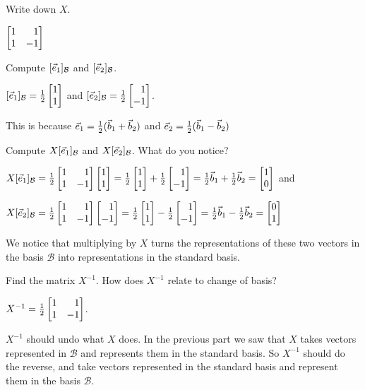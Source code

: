 	\begin{parts}
		\item Write down $X$.
			\begin{solution}[inline]
				$\mat{1&1\\1&-1}$
			\end{solution}
		\item Compute $[{\vec e_1}]_{\mathcal B}$ and $[{\vec e_2}]_{\mathcal B}$.
			\begin{solution}
				$[\xhat]_{\mathcal B}=\frac{1}{2}\mat{1\\1}$ and
				$[\yhat]_{\mathcal B}=\frac{1}{2}\mat{1\\-1}$.

				This is because ${\vec e_1}=\frac{1}{2}(\vec b_1+\vec b_2)$ and
				${\vec e_2}=\frac{1}{2}(\vec b_1-\vec b_2)$
			\end{solution}
		\item Compute $X[{\vec e_1}]_{\mathcal B}$ and $X[{\vec e_2}]_{\mathcal B}$.
			What do you notice?
			\begin{solution}
				$X[\xhat]_{\mathcal B}=\frac{1}{2}\mat{1&1\\1&-1}\mat{1\\1}
				=\frac{1}{2}\mat{1\\1}+\frac{1}{2}\mat{1\\-1}
				=\frac{1}{2}\vec b_1+\frac{1}{2}\vec b_2=\mat{1\\0}$
				and

				$X[\yhat]_{\mathcal B}=\frac{1}{2}\mat{1&1\\1&-1}\mat{1\\-1}
				=\frac{1}{2}\mat{1\\1}-\frac{1}{2}\mat{1\\-1}
				=\frac{1}{2}\vec b_1-\frac{1}{2}\vec b_2=\mat{0\\1}$

				We notice that multiplying by $X$ turns the representations	of
				these two vectors in the basis $\mathcal B$ into representations
				in the standard basis.
			\end{solution}
		\item Find the matrix $X^{-1}$. How does $X^{-1}$ relate to change of basis?
			\begin{solution}
				$X^{-1}=\tfrac{1}{2}\mat{1&1\\1&-1}$.

				$X^{-1}$ should undo what $X$ does. In the previous part we saw
				that $X$ takes vectors represented in $\mathcal B$ and represents
				them in the standard basis. So $X^{-1}$ should do the reverse, and
				take vectors represented in the standard basis and represent them
				in the basis $\mathcal B$.
			\end{solution}
	\end{parts}


